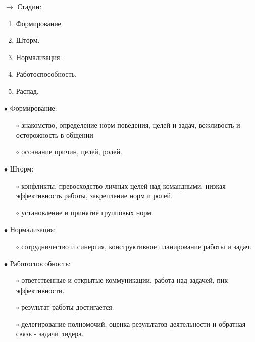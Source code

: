 \documentclass[12pt,a4paper]{report}
\begin{document}
\bigskip 
\begin{minipage}{0.4\textwidth}
	$\rightarrow$ Стадии: 
	\begin{enumerate}
		\item Формирование.
		\item Шторм.
		\item Нормализация.
		\item Работоспособность.
		\item Распад.
	\end{enumerate}
\end{minipage}
\hspace*{\fill}
\begin{minipage}{0.4\textwidth}
\end{minipage}
\newpage

$\bullet$ Формирование:
\begin{itemize}
	\item[$\circ$] знакомство, определение норм поведения, целей и задач, вежливость и осторожность в общении
	\item[$\circ$] осознание причин, целей, ролей.
\end{itemize}

$\bullet$ Шторм:
\begin{itemize}
	\item[$\circ$] конфликты, превосходство личных целей над командными, низкая эффективность работы, закрепление норм и ролей.
	\item[$\circ$] установление и принятие групповых норм.
\end{itemize}

$\bullet$ Нормализация:
\begin{itemize}
	\item[$\circ$] сотрудничество и синергия, конструктивное планирование работы и задач.
\end{itemize}

$\bullet$ Работоспособность:
\begin{itemize}
	\item[$\circ$] ответственные и открытые коммуникации, работа над задачей, пик эффективности.
	\item[$\circ$] результат работы достигается.
	\item[$\circ$] делегирование полномочий, оценка результатов деятельности и обратная связь - задачи лидера.
\end{itemize}
\end{document}
